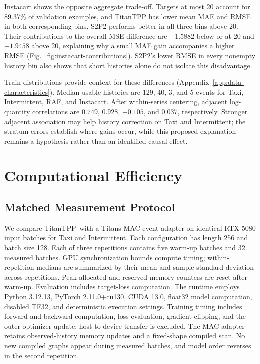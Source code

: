 \documentclass[runningheads]{llncs}
\newcommand{\method}{TitanTPP}
\begin{document}
Instacart shows the opposite aggregate trade-off. Targets at most 20 account
for 89.37\% of validation examples, and TitanTPP has lower mean MAE and RMSE
in both corresponding bins. S2P2 performs better in all three bins above 20.
Their contributions to the overall MSE difference are $-1.5882$ below or at
20 and $+1.9458$ above 20, explaining why a small MAE gain accompanies a
higher RMSE (Fig.~\ref{fig:instacart-contributions}). S2P2's lower RMSE
in every nonempty history bin also shows that short histories alone do not
isolate this disadvantage.

Train distributions provide context for these differences
(Appendix~\ref{app:data-characteristics}). Median usable histories are
129, 40, 3, and 5 events for Taxi, Intermittent, RAF, and Instacart.
After within-series centering, adjacent log-quantity correlations are
$0.749$, $0.928$, $-0.105$, and $0.037$, respectively. Stronger adjacent
association may help history correction on Taxi and Intermittent; the
stratum errors establish where gains occur, while this proposed explanation
remains a hypothesis rather than an identified causal effect.

\section{Computational Efficiency}
\subsection{Matched Measurement Protocol}
We compare \method\ with a Titans-MAC event adapter on identical RTX 5080
input batches for Taxi and Intermittent. Each configuration has length 256
and batch size 128. Each of three repetitions contains five warm-up batches
and 32 measured batches. GPU synchronization bounds compute timing;
within-repetition medians are summarized by their mean and sample standard
deviation across repetitions. Peak allocated and reserved memory counters
are reset after warm-up. Evaluation includes target-loss computation. The
runtime employs Python 3.12.13, PyTorch 2.11.0+cu130, CUDA 13.0, float32
model computation, disabled TF32, and deterministic execution settings.
Training timing includes forward and backward computation, loss evaluation,
gradient clipping, and the outer optimizer update; host-to-device transfer
is excluded. The MAC adapter retains observed-history memory updates and
a fixed-shape compiled scan. No new compiled graphs appear during measured
batches, and model order reverses in the second repetition.
\end{document}
